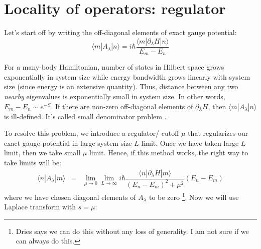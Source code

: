 \documentclass[11pt,a4paper]{article}
\begin{document}
\section{Locality of operators: regulator}
Let's start off by writing the off-diagonal elements of exact gauge potential:
\begin{equation}
\langle m |A_{\lambda} | n \rangle = i \hbar \dfrac{\langle m |\partial_{\lambda}H | n \rangle}{E_m-E_n}
\end{equation}

For a many-body Hamiltonian, number of states in Hilbert space grows exponentially in system size while energy bandwidth grows linearly with system size (since energy is an extensive quantity). Thus, distance between any two \textit{nearby} eigenvalues is exponentially small in system size. In other words, $E_m-E_n \sim e^{-S}$. If there are non-zero off-diagonal elements of $\partial_{\lambda}H $, then $\langle m |A_{\lambda} | n \rangle$ is ill-defined. It's called small denominator problem \cite{kolodrubetz2016geometry}.


 
To resolve this problem, we introduce a regulator/ cutoff $\mu$ that regularizes our exact gauge potential in large system size $L$ limit. Once we have taken large $L$ limit, then we take small $\mu$ limit. Hence, if this method works, the right way to take limits will be:
\begin{eqnarray}
\langle n | A_{\lambda} | m \rangle &=& \lim_{\mu \rightarrow 0} \lim_{L \rightarrow \infty } i \hbar \dfrac{\langle n | \partial_{\lambda}H  | m \rangle}{(E_n-E_m)^2 + \mu^2} (E_n-E_m) 
\end{eqnarray}
where we have chosen diagonal elements of $A_{\lambda}$ to be zero \footnote{Dries says we can do this without any loss of generality. I am not sure if we can always do this.}. 
Now we will use Laplace transform with $s=\mu$:
\end{document}
